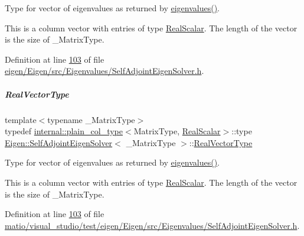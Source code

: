 Type for vector of eigenvalues as returned by \hyperlink{group___eigenvalues___module_a8efab27e82aa6aa0ae0c64739238c2e0}{eigenvalues()}. 

This is a column vector with entries of type \hyperlink{group___eigenvalues___module_a5dae5f422a3c71060e6bd31332bf64fd}{Real\+Scalar}. The length of the vector is the size of {\ttfamily \+\_\+\+Matrix\+Type}. 

Definition at line \hyperlink{eigen_2_eigen_2src_2_eigenvalues_2_self_adjoint_eigen_solver_8h_source_l00103}{103} of file \hyperlink{eigen_2_eigen_2src_2_eigenvalues_2_self_adjoint_eigen_solver_8h_source}{eigen/\+Eigen/src/\+Eigenvalues/\+Self\+Adjoint\+Eigen\+Solver.\+h}.

\mbox{\label{group___eigenvalues___module_acd090d5fdfc3cc017a13b6d8daa92287}} 
\subparagraph{\texorpdfstring{Real\+Vector\+Type}{RealVectorType}\hspace{0.1cm}{\footnotesize\ttfamily [2/2]}}
{\footnotesize\ttfamily template$<$typename \+\_\+\+Matrix\+Type$>$ \\
typedef \hyperlink{struct_eigen_1_1internal_1_1plain__col__type}{internal\+::plain\+\_\+col\+\_\+type}$<$Matrix\+Type, \hyperlink{group___eigenvalues___module_a5dae5f422a3c71060e6bd31332bf64fd}{Real\+Scalar}$>$\+::type \hyperlink{group___eigenvalues___module_class_eigen_1_1_self_adjoint_eigen_solver}{Eigen\+::\+Self\+Adjoint\+Eigen\+Solver}$<$ \+\_\+\+Matrix\+Type $>$\+::\hyperlink{group___eigenvalues___module_acd090d5fdfc3cc017a13b6d8daa92287}{Real\+Vector\+Type}}



Type for vector of eigenvalues as returned by \hyperlink{group___eigenvalues___module_a8efab27e82aa6aa0ae0c64739238c2e0}{eigenvalues()}. 

This is a column vector with entries of type \hyperlink{group___eigenvalues___module_a5dae5f422a3c71060e6bd31332bf64fd}{Real\+Scalar}. The length of the vector is the size of {\ttfamily \+\_\+\+Matrix\+Type}. 

Definition at line \hyperlink{matio_2visual__studio_2test_2eigen_2_eigen_2src_2_eigenvalues_2_self_adjoint_eigen_solver_8h_source_l00103}{103} of file \hyperlink{matio_2visual__studio_2test_2eigen_2_eigen_2src_2_eigenvalues_2_self_adjoint_eigen_solver_8h_source}{matio/visual\+\_\+studio/test/eigen/\+Eigen/src/\+Eigenvalues/\+Self\+Adjoint\+Eigen\+Solver.\+h}.



